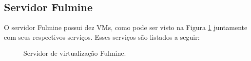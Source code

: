 \subsection{Servidor Fulmine}
\label{section:serv_fulmine}

O servidor Fulmine possui dez \ac{VM}s, como pode ser visto na Figura \ref{fig:servidor_fulmine} juntamente com seus respectivos serviços. 
Esses serviços são listados a seguir:

\begin{figure}[h!]
 \centering
 \caption{Servidor de virtualização Fulmine.}
 \label{fig:servidor_fulmine}
\end{figure}

